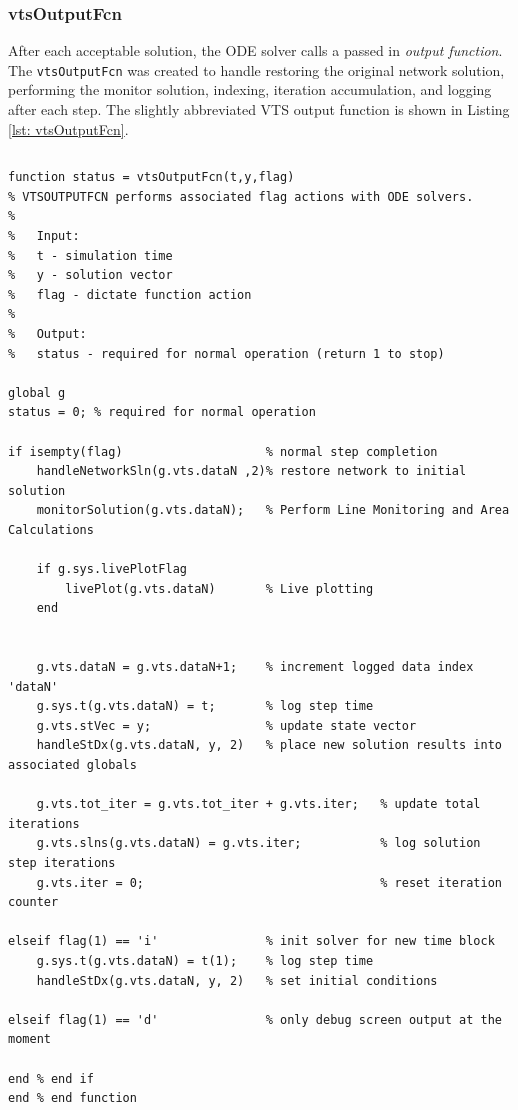 
\pagebreak
\subsubsection{vtsOutputFcn} 
After each acceptable solution, the ODE solver calls a passed in \emph{output function}.
The \verb|vtsOutputFcn| was created to handle restoring the original network solution, performing the monitor solution, indexing, iteration accumulation, and logging after each step.
The slightly abbreviated VTS output function is shown in Listing \ref{lst: vtsOutputFcn}.

\pagebreak
\begin{lstlisting}[caption={Abbreviated vtsOutputFcn},label={lst: vtsOutputFcn}]
\end{lstlisting}\vspace{-2 em}
\begin{verbatim}
function status = vtsOutputFcn(t,y,flag)
% VTSOUTPUTFCN performs associated flag actions with ODE solvers.
%
%   Input:
%   t - simulation time
%   y - solution vector
%   flag - dictate function action
%
%   Output:
%   status - required for normal operation (return 1 to stop)

global g 
status = 0; % required for normal operation

if isempty(flag)                    % normal step completion
    handleNetworkSln(g.vts.dataN ,2)% restore network to initial solution   
    monitorSolution(g.vts.dataN);   % Perform Line Monitoring and Area Calculations 
    
    if g.sys.livePlotFlag
        livePlot(g.vts.dataN)       % Live plotting
    end
    
    
    g.vts.dataN = g.vts.dataN+1;    % increment logged data index 'dataN'
    g.sys.t(g.vts.dataN) = t;       % log step time
    g.vts.stVec = y;                % update state vector
    handleStDx(g.vts.dataN, y, 2)   % place new solution results into associated globals
    
    g.vts.tot_iter = g.vts.tot_iter + g.vts.iter;   % update total iterations
    g.vts.slns(g.vts.dataN) = g.vts.iter;           % log solution step iterations
    g.vts.iter = 0;                                 % reset iteration counter
    
elseif flag(1) == 'i'               % init solver for new time block
    g.sys.t(g.vts.dataN) = t(1);    % log step time
    handleStDx(g.vts.dataN, y, 2)   % set initial conditions
  
elseif flag(1) == 'd'               % only debug screen output at the moment

end % end if
end % end function
\end{verbatim}



